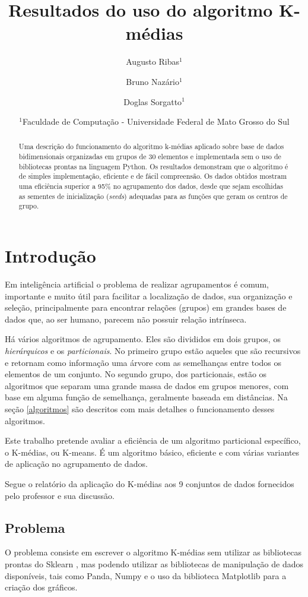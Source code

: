 \documentclass[12pt, a4paper]{article}
\title{Resultados do uso do algoritmo K-médias}
\author{Augusto Ribas$^1$ \and Bruno Nazário$^1$ \and Doglas Sorgatto$^1$}
\date{$^1$Faculdade de Computação - Universidade Federal de Mato Grosso do Sul}
\begin{document}
\maketitle

\begin{abstract}
Uma descrição do funcionamento do algoritmo k-médias aplicado sobre base de dados bidimensionais organizadas em grupos de 30 elementos e implementada sem o uso de bibliotecas prontas na linguagem Python. Os resultados demonstram que o algoritmo é de simples implementação, eficiente e de fácil compreensão. Os dados obtidos mostram uma eficiência superior a 95\% no agrupamento dos dados, desde que sejam escolhidas as sementes de inicialização (\emph{seeds}) adequadas para as funções que geram os centros de grupo.
\end{abstract}
%
\section{Introdução}
Em inteligência artificial o problema de realizar agrupamentos é comum, importante e muito útil para facilitar a localização de dados, sua organização e seleção, principalmente para encontrar relações (grupos) em grandes bases de dados que, ao ser humano, parecem não possuir relação intrínseca.

Há vários algoritmos de agrupamento. Eles são divididos em dois grupos, os \textit{hierárquicos} e os \textit{particionais}. No primeiro grupo estão aqueles que são recursivos e retornam como informação uma árvore com as semelhanças entre todos os elementos de um conjunto. No segundo grupo, dos particionais, estão os algoritmos que separam uma grande massa de dados em grupos menores, com base em alguma função de semelhança, geralmente baseada em distâncias. Na seção \ref{algoritmos} são descritos com mais detalhes o funcionamento desses algoritmos.

Este trabalho pretende avaliar a eficiência de um algoritmo particional específico, o K-médias, ou K-means. É um algoritmo básico, eficiente e com várias variantes de aplicação no agrupamento de dados.

Segue o relatório da aplicação do K-médias aos 9 conjuntos de dados fornecidos pelo professor e sua discussão.


\subsection{Problema}
O problema consiste em escrever o algoritmo K-médias sem utilizar as bibliotecas prontas do Sklearn \citep{scikit-learn}, mas podendo utilizar as bibliotecas de manipulação de dados disponíveis, tais como Panda, Numpy e o uso da biblioteca Matplotlib para a criação dos gráficos.
\end{document}
